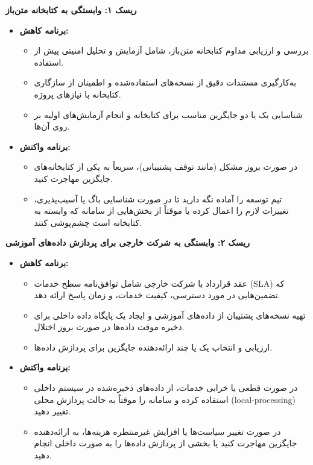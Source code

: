\begin{flushright}

	
	\textbf{ریسک ۱: وابستگی به کتابخانه متن‌باز}
	\begin{itemize}
		\item \textbf{برنامه کاهش:}
		\begin{itemize}
			\item بررسی و ارزیابی مداوم کتابخانه متن‌باز، شامل آزمایش و تحلیل امنیتی پیش از استفاده.
			\item به‌کارگیری مستندات دقیق از نسخه‌های استفاده‌شده و اطمینان از سازگاری کتابخانه با نیازهای پروژه.
			\item شناسایی یک یا دو جایگزین مناسب برای کتابخانه و انجام آزمایش‌های اولیه بر روی آن‌ها.
		\end{itemize}
		\item \textbf{برنامه واکنش:}
		\begin{itemize}
			\item در صورت بروز مشکل (مانند توقف پشتیبانی)، سریعاً به یکی از کتابخانه‌های جایگزین مهاجرت کنید.
			\item تیم توسعه را آماده نگه دارید تا در صورت شناسایی باگ یا آسیب‌پذیری، تغییرات لازم را اعمال کرده یا موقتاً از بخش‌هایی از سامانه که وابسته به کتابخانه است چشم‌پوشی کنند.
		\end{itemize}
	\end{itemize}
	
	\textbf{ریسک ۲: وابستگی به شرکت خارجی برای پردازش داده‌های آموزشی}
	\begin{itemize}
		\item \textbf{برنامه کاهش:}
		\begin{itemize}
			\item عقد قرارداد با شرکت خارجی شامل توافق‌نامه سطح خدمات (SLA) که تضمین‌هایی در مورد دسترسی، کیفیت خدمات، و زمان پاسخ ارائه دهد.
			\item تهیه نسخه‌های پشتیبان از داده‌های آموزشی و ایجاد یک پایگاه داده داخلی برای ذخیره موقت داده‌ها در صورت بروز اختلال.
			\item ارزیابی و انتخاب یک یا چند ارائه‌دهنده جایگزین برای پردازش داده‌ها.
		\end{itemize}
		\item \textbf{برنامه واکنش:}
		\begin{itemize}
			\item در صورت قطعی یا خرابی خدمات، از داده‌های ذخیره‌شده در سیستم داخلی استفاده کرده و سامانه را موقتاً به حالت پردازش محلی (local-processing) تغییر دهید.
			\item در صورت تغییر سیاست‌ها یا افزایش غیرمنتظره هزینه‌ها، به ارائه‌دهنده جایگزین مهاجرت کنید یا بخشی از پردازش داده‌ها را به صورت داخلی انجام دهید.
		\end{itemize}
	\end{itemize}
	
\end{flushright}
